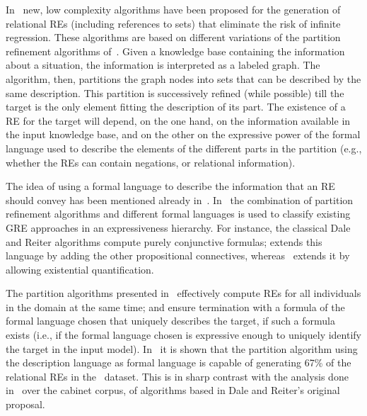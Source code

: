 In~\cite{arec:refe08,arec:usin11} new, low complexity algorithms have been proposed for the generation 
of relational REs (including references to sets) that eliminate the risk of infinite regression. 
These algorithms are based on different variations of the partition refinement algorithms of~\cite{paig:thre87}.
Given a knowledge base containing the information about a situation, the information is 
interpreted as a labeled graph.  The algorithm, then, partitions the graph nodes into sets that can 
be described by the same description.  This partition is successively refined (while possible) till the target 
is the only element fitting the description of its part.  The existence of a RE for the target will 
depend, on the one hand, on the information available in the input knowledge base, and on the other 
on the expressive power of the formal language used to describe the elements of the different 
parts in the partition (e.g., whether the REs can contain negations, or relational information). 

The idea of using a formal language to describe the information that an RE should convey has been mentioned
already in~\cite{Krahmer2003,gardent07:_gener_bridg_defin_descr}.  In~\cite{arec:refe08,arec:usin11} the 
combination of partition refinement algorithms and different formal languages is used to classify existing 
GRE approaches in an expressiveness hierarchy.  For instance, the classical Dale and Reiter algorithms
compute purely conjunctive formulas; \cite{deemter02:_gener_refer_expres} extends this language by
adding the other propositional connectives, whereas~\cite{dale91:_gener_refer_expres_invol_relat} extends it by
allowing existential quantification.

The partition algorithms presented in~\cite{arec:refe08,arec:usin11} effectively
compute REs for all individuals in the domain at the same time; and ensure termination with a formula of 
the formal language chosen that uniquely describes the target, if such a formula exists (i.e., if the 
formal language chosen is expressive enough to uniquely identify the target in the input model). In~\cite{arec:refe08}
it is shown that the partition algorithm using the description language \el as formal language is capable of generating 67\% of 
the relational REs in the~\cite{viethen06:_algor_for_gener_refer_expres} dataset. This is in sharp contrast with the analysis 
done in~\cite{viethen06:_algor_for_gener_refer_expres} over the cabinet corpus, of algorithms based in Dale and Reiter's original proposal.    

